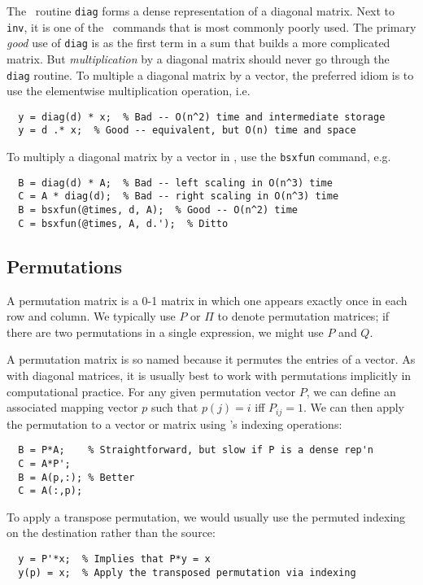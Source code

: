 The \matlab\ routine {\tt diag} forms a dense representation of a
diagonal matrix.  Next to {\tt inv}, it is one of the \matlab\ commands
that is most commonly poorly used.  The primary {\em good} use of
{\tt diag} is as the first term in a sum that builds a more complicated matrix.
But {\em multiplication} by a diagonal matrix should never go through the
{\tt diag} routine.  To multiple a diagonal matrix by a vector, the preferred
idiom is to use the elementwise multiplication operation, i.e.
\begin{lstlisting}
  y = diag(d) * x;  % Bad -- O(n^2) time and intermediate storage
  y = d .* x;  % Good -- equivalent, but O(n) time and space
\end{lstlisting}
To multiply a diagonal matrix by a vector in \matlab, use the {\tt bsxfun}
command, e.g.
\begin{lstlisting}
  B = diag(d) * A;  % Bad -- left scaling in O(n^3) time
  C = A * diag(d);  % Bad -- right scaling in O(n^3) time
  B = bsxfun(@times, d, A);  % Good -- O(n^2) time
  C = bsxfun(@times, A, d.');  % Ditto
\end{lstlisting}

\subsection{Permutations}

A permutation matrix is a 0-1 matrix in which one appears exactly
once in each row and column.  We typically use $P$ or $\Pi$ to
denote permutation matrices; if there are two permutations in a
single expression, we might use $P$ and $Q$.

A permutation matrix is so named because it permutes the entries
of a vector.  As with diagonal matrices, it is usually best to
work with permutations implicitly in computational practice.
For any given permutation vector $P$, we can define an associated
mapping vector $p$ such that $p(j) = i$ iff $P_{ij} = 1$.  We can
then apply the permutation to a vector or matrix using \matlab's
indexing operations:
\begin{lstlisting}
  B = P*A;    % Straightforward, but slow if P is a dense rep'n
  C = A*P';
  B = A(p,:); % Better
  C = A(:,p);
\end{lstlisting}
To apply a transpose permutation, we would usually use the permuted
indexing on the destination rather than the source:
\begin{lstlisting}
  y = P'*x;  % Implies that P*y = x
  y(p) = x;  % Apply the transposed permutation via indexing
\end{lstlisting}

